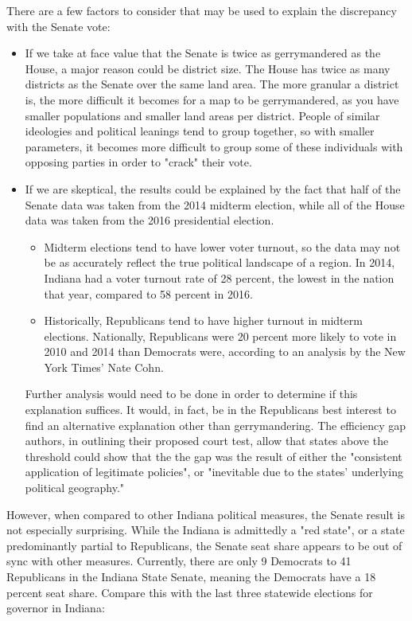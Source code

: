 \documentclass[sigconf]{acmart}
\begin{document}
There are a few factors to consider that may be used to explain the discrepancy with the Senate vote:
\begin{itemize}
    \item If we take at face value that the Senate is twice as gerrymandered as the House, a major reason could be district size. The House has twice as many districts as the Senate over the same land area. The more granular a district is, the more difficult it becomes for a map to be gerrymandered, as you have smaller populations and smaller land areas per district. People of similar ideologies and political leanings tend to group together, so with smaller parameters, it becomes more difficult to group some of these individuals with opposing parties in order to "crack" their vote. 
    \item If we are skeptical, the results could be explained by the fact that half of the Senate data was taken from the 2014 midterm election, while all of the House data was taken from the 2016 presidential election. 
    \begin{itemize}
        \item Midterm elections tend to have lower voter turnout, so the data may not be as accurately reflect the true political landscape of a region. In 2014, Indiana had a voter turnout rate of 28 percent, the lowest in the nation that year\cite{2014turnout}, compared to 58 percent in 2016.\cite{2016turnout}
        \item Historically, Republicans tend to have higher turnout in midterm elections. Nationally, Republicans were 20 percent more likely to vote in 2010 and 2014 than Democrats were, according to an analysis by the New York Times' Nate Cohn. \cite{cohn}
    \end{itemize}
    Further analysis would need to be done in order to determine if this explanation suffices. It would, in fact, be in the Republicans best interest to find an alternative explanation other than gerrymandering. The efficiency gap authors, in outlining their proposed court test, allow that states above the threshold could show that the the gap was the result of either the "consistent application of legitimate policies", or "inevitable due to the states' underlying political geography."\cite{chicagothreshold}
\end{itemize}

However, when compared to other Indiana political measures, the Senate result is not especially surprising. While the Indiana is admittedly a "red state", or a state predominantly partial to Republicans, the Senate seat share appears to be out of sync with other measures. Currently, there are only 9 Democrats to 41 Republicans in the Indiana State Senate\cite{senateresults2014}\cite{senateresults2016}, meaning the Democrats have a 18 percent seat share. Compare this with the last three statewide elections for governor in Indiana:
\end{document}
